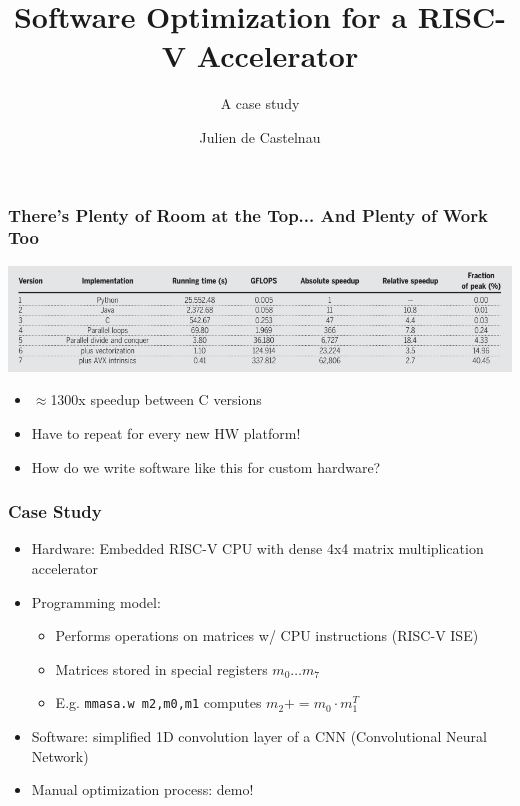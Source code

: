\documentclass[aspectratio=169]{beamer}
\title[Software Optimization for Accelerators] %
{Software Optimization for a RISC-V Accelerator}
\subtitle{A case study}
\author[Julien de Castelnau] %
{Julien de Castelnau}
\date[26-08-2024] %
\newcommand{\pluseq}{\mathrel{{+}{=}}}
\begin{document}
\frame{\titlepage}

\begin{frame}
\frametitle{There's Plenty of Room at the Top... And Plenty of Work Too}
\includegraphics[width=1.0\linewidth]{figs/opt.png}
\begin{itemize}
    \item $\approx$1300x speedup between C versions\pause
    \item Have to repeat for every new HW platform!
    \item \large How do we write software like this for custom hardware?
\end{itemize}
\end{frame}

\begin{frame}[containsverbatim]
\frametitle{Case Study}
\begin{itemize}
\item Hardware: Embedded RISC-V CPU with dense 4x4 matrix multiplication accelerator
\item Programming model:
\begin{itemize}
\item Performs operations on matrices w/ CPU instructions (RISC-V ISE)
\item Matrices stored in special registers $m_0 \dots m_7$
\item E.g. \verb|mmasa.w m2,m0,m1| computes $m_2 \pluseq m_0 \cdot m_1^T$ 
\end{itemize}
\item Software: simplified 1D convolution layer of a CNN (Convolutional Neural Network)
\item Manual optimization process: demo!
\end{itemize}
\end{frame}
\end{document}
